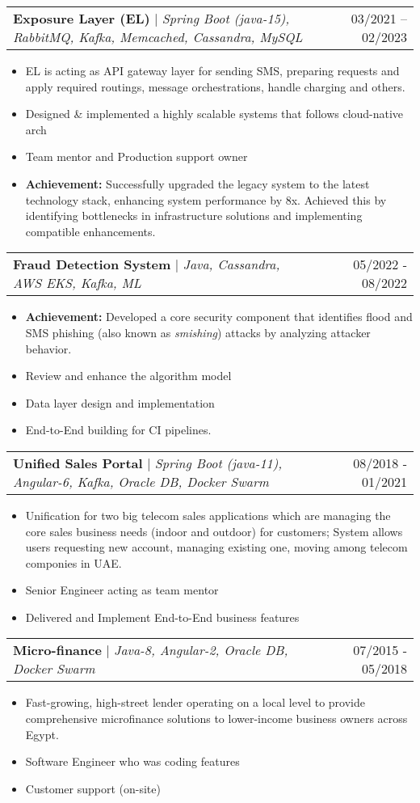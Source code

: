 \documentclass[letterpaper,11pt]{article}
\makeatletter
\newcommand{\resumeItem}[1]{
  \item\small{
    {#1 \vspace{-2pt}}
  }
}
\newcommand{\resumeProjectHeading}[2]{
    \item
    \begin{tabular*}{0.97\textwidth}{l@{\extracolsep{\fill}}r}
      \small#1 & #2 \\
    \end{tabular*}\vspace{-7pt}
}
\newcommand{\resumeItemListStart}{\begin{itemize}}
\newcommand{\resumeItemListEnd}{\end{itemize}\vspace{-5pt}}
\makeatother
\begin{document}
        \resumeProjectHeading
        {\textbf{Exposure Layer (EL)} $|$ \footnotesize\emph{Spring Boot (java-15), RabbitMQ, Kafka, Memcached, Cassandra, MySQL}}
        {03/2021 -- 02/2023}
        \resumeItemListStart
            \resumeItem{EL is acting as API gateway layer for sending SMS, preparing requests and apply required routings, message orchestrations, handle charging and others.}
            \resumeItem{Designed \& implemented a highly scalable systems that follows cloud-native arch}
            \resumeItem{Team mentor and Production support owner}
            \resumeItem{\textbf{Achievement:} Successfully upgraded the legacy system to the latest technology stack, enhancing system performance by 8x. Achieved this by identifying bottlenecks in infrastructure solutions and implementing compatible enhancements. }
          \resumeItemListEnd
          
      \resumeProjectHeading
        {\textbf{Fraud Detection System} $|$ \footnotesize\emph{Java, Cassandra, AWS EKS, Kafka, ML}}{05/2022 - 08/2022}
        \resumeItemListStart
            \resumeItem{\textbf{Achievement:} Developed a core security component that identifies flood and SMS phishing (also known as \textit{smishing}) attacks by analyzing attacker behavior.}
            \resumeItem{Review and enhance the algorithm model}
            \resumeItem{Data layer design and implementation}
            \resumeItem{End-to-End building for CI pipelines.}
        \resumeItemListEnd

      \resumeProjectHeading
        {\textbf{Unified Sales Portal} $|$ \footnotesize\emph{Spring Boot (java-11), Angular-6, Kafka, Oracle DB, Docker Swarm}}
        {08/2018 - 01/2021}
        \resumeItemListStart
            \resumeItem{Unification for two big telecom sales applications which are managing the core sales business needs (indoor and outdoor) for customers; System allows users requesting new account, managing existing one, moving among telecom componies in UAE.}
            \resumeItem{Senior Engineer acting as team mentor}
            \resumeItem{Delivered and Implement End-to-End business features}
        \resumeItemListEnd

      \resumeProjectHeading
        {\textbf{Micro-finance} $|$ \footnotesize\emph{Java-8, Angular-2, Oracle DB, Docker Swarm}}
        {07/2015 - 05/2018}
        \resumeItemListStart
            \resumeItem{Fast-growing, high-street lender operating on a local level to provide comprehensive microfinance solutions to lower-income business owners across Egypt.}
            \resumeItem{Software Engineer who was coding features}
            \resumeItem{Customer support (on-site)}
        \resumeItemListEnd
          
\end{document}
